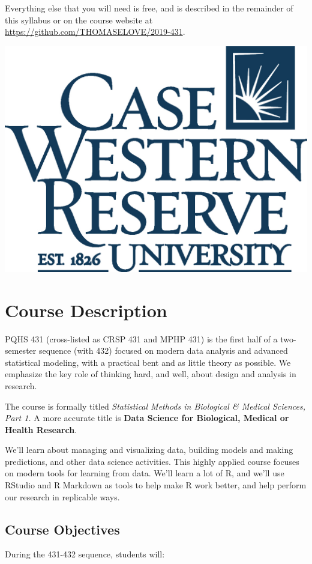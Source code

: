 \documentclass[
]{book}
\begin{document}
Everything else that you will need is free, and is described in the remainder of this syllabus or on the course website at \url{https://github.com/THOMASELOVE/2019-431}.

\includegraphics[width=0.2\linewidth]{images/cwru-stacked-logo}

\hypertarget{course-description}{%
\chapter{Course Description}\label{course-description}}

PQHS 431 (cross-listed as CRSP 431 and MPHP 431) is the first half of a two-semester sequence (with 432) focused on modern data analysis and advanced statistical modeling, with a practical bent and as little theory as possible. We emphasize the key role of thinking hard, and well, about design and analysis in research.

The course is formally titled \emph{Statistical Methods in Biological \& Medical Sciences, Part 1.} A more accurate title is \textbf{Data Science for Biological, Medical or Health Research}.

We'll learn about managing and visualizing data, building models and making predictions, and other data science activities. This highly applied course focuses on modern tools for learning from data. We'll learn a lot of R, and we'll use RStudio and R Markdown as tools to help make R work better, and help perform our research in replicable ways.

\hypertarget{course-objectives}{%
\section{Course Objectives}\label{course-objectives}}

During the 431-432 sequence, students will:
\end{document}
